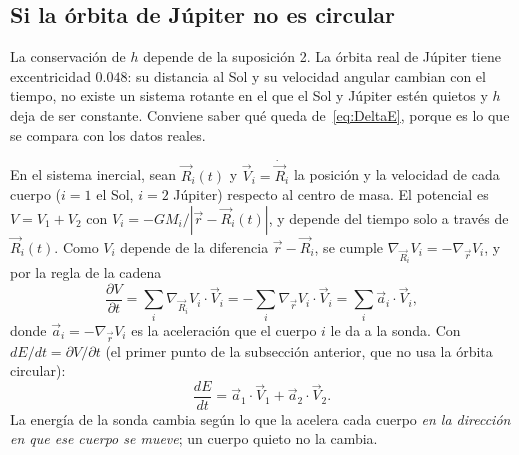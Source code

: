 \documentclass[12pt,letterpaper]{article}
\begin{document}
\subsection{Si la órbita de Júpiter no es circular}

La conservación de $h$ depende de la suposición 2. La órbita real de Júpiter tiene
excentricidad $0.048$: su distancia al Sol y su velocidad angular cambian con el tiempo, no
existe un sistema rotante en el que el Sol y Júpiter estén quietos y $h$ deja de ser
constante. Conviene saber qué queda de~\eqref{eq:DeltaE}, porque es lo que se compara con
los datos reales.

En el sistema inercial, sean $\vec R_i(t)$ y $\vec V_i = \dot{\vec R}_i$ la posición y la
velocidad de cada cuerpo ($i = 1$ el Sol, $i = 2$ Júpiter) respecto al centro de masa. El
potencial es $V = V_1 + V_2$ con $V_i = -GM_i/|\vec r - \vec R_i(t)|$, y depende del tiempo solo
a través de $\vec R_i(t)$. Como $V_i$ depende de la diferencia $\vec r - \vec R_i$, se cumple
$\nabla_{\vec R_i}V_i = -\nabla_{\vec r}V_i$, y por la regla de la cadena
\[
\frac{\partial V}{\partial t} = \sum_i \nabla_{\vec R_i}V_i\cdot\vec V_i
= -\sum_i \nabla_{\vec r}V_i\cdot\vec V_i = \sum_i \vec a_i\cdot\vec V_i ,
\]
donde $\vec a_i = -\nabla_{\vec r}V_i$ es la aceleración que el cuerpo $i$ le da a la sonda. Con
$dE/dt = \partial V/\partial t$ (el primer punto de la subsección anterior, que no usa la
órbita circular):
\begin{equation}
\frac{dE}{dt} = \vec a_1\cdot\vec V_1 + \vec a_2\cdot\vec V_2 .
\label{eq:potencia}
\end{equation}
La energía de la sonda cambia según lo que la acelera cada cuerpo \emph{en la dirección en que
ese cuerpo se mueve}; un cuerpo quieto no la cambia.
\end{document}
